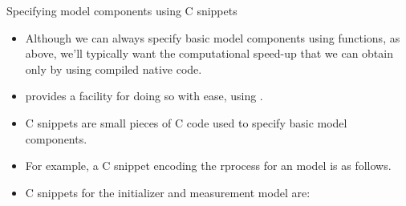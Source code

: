 \begin{frame}{Specifying model components using C snippets}

  \begin{itemize}

  \item Although we can always specify basic model components using \Rlanguage functions, as above, we'll typically want the computational speed-up that we can obtain only by using compiled native code.

  \item {} provides a facility for doing so with ease, using .

  \item C snippets are small pieces of C code used to specify basic model components.

  \item For example, a C snippet encoding the rprocess for an  model is as follows.
    
\begin{knitrout}\small
{}\color{fgcolor}\begin{kframe}
\begin{alltt}
 \hlkwb{<-} \hlstd{(}\hlstd{)}
\end{alltt}
\end{kframe}
\end{knitrout}
    
  \item
    C snippets for the initializer and measurement model are:

\begin{knitrout}\small
{}\color{fgcolor}\begin{kframe}
\begin{alltt}
 \hlkwb{<-} \hlstd{(}\hlstd{)}

 \hlkwb{<-} \hlstd{(}\hlstd{)}

 \hlkwb{<-} \hlstd{(}\hlstd{)}
\end{alltt}
\end{kframe}
\end{knitrout}
    

\end{itemize}
\end{frame}
